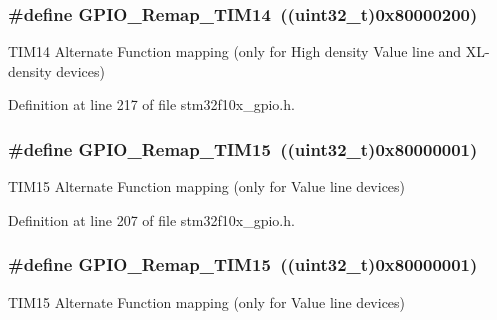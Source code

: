 \subsubsection[{\texorpdfstring{G\+P\+I\+O\+\_\+\+Remap\+\_\+\+T\+I\+M14}{GPIO_Remap_TIM14}}]{\setlength{\rightskip}{0pt plus 5cm}\#define G\+P\+I\+O\+\_\+\+Remap\+\_\+\+T\+I\+M14~(({\bf uint32\+\_\+t})0x80000200)}\hypertarget{group___g_p_i_o___remap__define_gaa2ae554ed69ad3368c2cd7db678b3fd0}{}\label{group___g_p_i_o___remap__define_gaa2ae554ed69ad3368c2cd7db678b3fd0}
T\+I\+M14 Alternate Function mapping (only for High density Value line and X\+L-\/density devices) 

Definition at line 217 of file stm32f10x\+\_\+gpio.\+h.

\subsubsection[{\texorpdfstring{G\+P\+I\+O\+\_\+\+Remap\+\_\+\+T\+I\+M15}{GPIO_Remap_TIM15}}]{\setlength{\rightskip}{0pt plus 5cm}\#define G\+P\+I\+O\+\_\+\+Remap\+\_\+\+T\+I\+M15~(({\bf uint32\+\_\+t})0x80000001)}\hypertarget{group___g_p_i_o___remap__define_gaead5c447875e8b384945424845452b82}{}\label{group___g_p_i_o___remap__define_gaead5c447875e8b384945424845452b82}
T\+I\+M15 Alternate Function mapping (only for Value line devices) 

Definition at line 207 of file stm32f10x\+\_\+gpio.\+h.

\subsubsection[{\texorpdfstring{G\+P\+I\+O\+\_\+\+Remap\+\_\+\+T\+I\+M15}{GPIO_Remap_TIM15}}]{\setlength{\rightskip}{0pt plus 5cm}\#define G\+P\+I\+O\+\_\+\+Remap\+\_\+\+T\+I\+M15~(({\bf uint32\+\_\+t})0x80000001)}\hypertarget{group___g_p_i_o___remap__define_gaead5c447875e8b384945424845452b82}{}\label{group___g_p_i_o___remap__define_gaead5c447875e8b384945424845452b82}
T\+I\+M15 Alternate Function mapping (only for Value line devices) 

